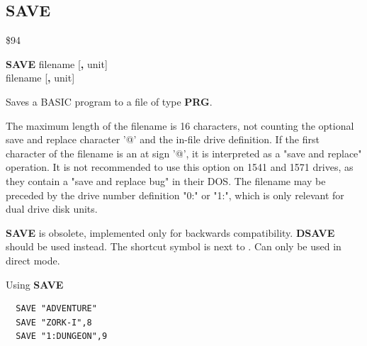 \subsection{SAVE}
\begin{description}[leftmargin=2cm,style=nextline]
\item [Token:] \$94
\item [Format:] {\bf SAVE} filename [{\bf,} unit] \\
                \megakeywhite{$\leftarrow$} filename [{\bf,} unit]
\item [Usage:]
   Saves a BASIC program to a file of type {\bf PRG}.

   \filenamedefinition

   The maximum length of the filename is 16 characters,
   not counting the optional save and replace character '@'
   and the in-file drive definition.
   If the first character of the filename is an at sign '@', it
   is interpreted as a "save and replace" operation. It is not recommended
   to use this option on 1541 and 1571 drives, as they
   contain a "save and replace bug" in their DOS.
   The filename may be preceded by the drive number definition
   "0:" or "1:", which is only relevant for dual drive disk units.

   \unitdefinition

\item [Remarks:] {\bf SAVE} is obsolete, implemented only for backwards compatibility.
                 {\bf DSAVE} should be used instead.
                 The shortcut symbol \megakeywhite{$\leftarrow$} is next to . Can only be used in direct mode.

\item [Examples:] Using {\bf SAVE}
\begin{tcolorbox}[colback=black,coltext=white]
\verbatimfont{\codefont}
\begin{verbatim}
  SAVE "ADVENTURE"
  SAVE "ZORK-I",8
  SAVE "1:DUNGEON",9
\end{verbatim}
\end{tcolorbox}
\end{description}


\newpage
